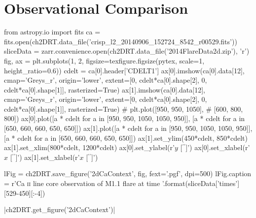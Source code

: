 \section{Observational Comparison}


\begin{pycode}[2DRT]
from astropy.io import fits
ca = fits.open(ch2DRT.data_file('crisp_l2_20140906_152724_8542_r00529.fits'))
sliceData = zarr.convenience.open(ch2DRT.data_file('2014FlareData2d.zip'), 'r')
fig, ax = plt.subplots(1, 2, figsize=texfigure.figsize(pytex, scale=1, height_ratio=0.6))
cdelt = ca[0].header['CDELT1']
ax[0].imshow(ca[0].data[12], cmap='Greys_r', origin='lower', extent=[0, cdelt*ca[0].shape[2], 0, cdelt*ca[0].shape[1]], rasterized=True)
ax[1].imshow(ca[0].data[12], cmap='Greys_r', origin='lower', extent=[0, cdelt*ca[0].shape[2], 0, cdelt*ca[0].shape[1]], rasterized=True)
# plt.plot([950, 950, 1050],
#     [600, 800, 800])
ax[0].plot([a * cdelt for a in [950, 950, 1050, 1050, 950]],
    [a * cdelt for a in [650, 660, 660, 650, 650]])
ax[1].plot([a * cdelt for a in [950, 950, 1050, 1050, 950]],
    [a * cdelt for a in [650, 660, 660, 650, 650]])
ax[1].set_ylim(450*cdelt, 850*cdelt)
ax[1].set_xlim(800*cdelt, 1200*cdelt)
ax[0].set_ylabel(r'$y$ [$^{\prime\prime}$]')
ax[0].set_xlabel(r'$x$ [$^{\prime\prime}$]')
ax[1].set_xlabel(r'$x$ [$^{\prime\prime}$]')

lFig = ch2DRT.save_figure('2dCaContext', fig, fext='.pgf', dpi=500)
lFig.caption = r'Ca \textsc{{ii}} line core observation of M1.1 flare at time {}'.format(sliceData['times'][529-450][:-4])
\end{pycode}

\py[2DRT]|ch2DRT.get_figure('2dCaContext')|


